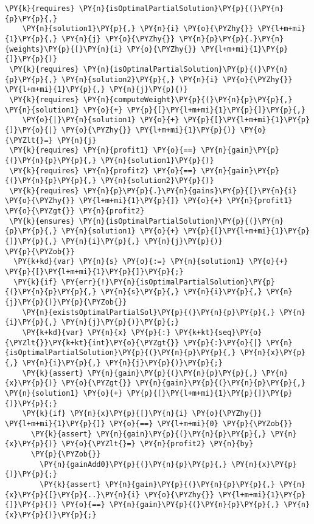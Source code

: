 \begin{sloppypar}
\begin{enumerate}
\begin{Verbatim}[commandchars=\\\{\}]
 \PY{k}{requires} \PY{n}{isOptimalPartialSolution}\PY{p}{(}\PY{n}{p}\PY{p}{,} 
    \PY{n}{solution1}\PY{p}{,} \PY{n}{i} \PY{o}{\PYZhy{}} \PY{l+m+mi}{1}\PY{p}{,} \PY{n}{j} \PY{o}{\PYZhy{}} \PY{n}{p}\PY{p}{.}\PY{n}{weights}\PY{p}{[}\PY{n}{i} \PY{o}{\PYZhy{}} \PY{l+m+mi}{1}\PY{p}{]}\PY{p}{)}
 \PY{k}{requires} \PY{n}{isOptimalPartialSolution}\PY{p}{(}\PY{n}{p}\PY{p}{,} \PY{n}{solution2}\PY{p}{,} \PY{n}{i} \PY{o}{\PYZhy{}} \PY{l+m+mi}{1}\PY{p}{,} \PY{n}{j}\PY{p}{)}
 \PY{k}{requires} \PY{n}{computeWeight}\PY{p}{(}\PY{n}{p}\PY{p}{,} \PY{n}{solution1} \PY{o}{+} \PY{p}{[}\PY{l+m+mi}{1}\PY{p}{]}\PY{p}{,} 
    \PY{o}{|}\PY{n}{solution1} \PY{o}{+} \PY{p}{[}\PY{l+m+mi}{1}\PY{p}{]}\PY{o}{|} \PY{o}{\PYZhy{}} \PY{l+m+mi}{1}\PY{p}{)} \PY{o}{\PYZlt{}=} \PY{n}{j}
 \PY{k}{requires} \PY{n}{profit1} \PY{o}{==} \PY{n}{gain}\PY{p}{(}\PY{n}{p}\PY{p}{,} \PY{n}{solution1}\PY{p}{)}
 \PY{k}{requires} \PY{n}{profit2} \PY{o}{==} \PY{n}{gain}\PY{p}{(}\PY{n}{p}\PY{p}{,} \PY{n}{solution2}\PY{p}{)}
 \PY{k}{requires} \PY{n}{p}\PY{p}{.}\PY{n}{gains}\PY{p}{[}\PY{n}{i} \PY{o}{\PYZhy{}} \PY{l+m+mi}{1}\PY{p}{]} \PY{o}{+} \PY{n}{profit1} \PY{o}{\PYZgt{}} \PY{n}{profit2}
 \PY{k}{ensures} \PY{n}{isOptimalPartialSolution}\PY{p}{(}\PY{n}{p}\PY{p}{,} \PY{n}{solution1} \PY{o}{+} \PY{p}{[}\PY{l+m+mi}{1}\PY{p}{]}\PY{p}{,} \PY{n}{i}\PY{p}{,} \PY{n}{j}\PY{p}{)}
\PY{p}{\PYZob{}}
  \PY{k+kd}{var} \PY{n}{s} \PY{o}{:=} \PY{n}{solution1} \PY{o}{+} \PY{p}{[}\PY{l+m+mi}{1}\PY{p}{]}\PY{p}{;}
  \PY{k}{if} \PY{err}{!}\PY{n}{isOptimalPartialSolution}\PY{p}{(}\PY{n}{p}\PY{p}{,} \PY{n}{s}\PY{p}{,} \PY{n}{i}\PY{p}{,} \PY{n}{j}\PY{p}{)}\PY{p}{\PYZob{}}
    \PY{n}{existsOptimalPartialSol}\PY{p}{(}\PY{n}{p}\PY{p}{,} \PY{n}{i}\PY{p}{,} \PY{n}{j}\PY{p}{)}\PY{p}{;}
    \PY{k+kd}{var} \PY{n}{x} \PY{p}{:} \PY{k+kt}{seq}\PY{o}{\PYZlt{}}\PY{k+kt}{int}\PY{o}{\PYZgt{}} \PY{p}{:}\PY{o}{|} \PY{n}{isOptimalPartialSolution}\PY{p}{(}\PY{n}{p}\PY{p}{,} \PY{n}{x}\PY{p}{,} \PY{n}{i}\PY{p}{,} \PY{n}{j}\PY{p}{)}\PY{p}{;}
    \PY{k}{assert} \PY{n}{gain}\PY{p}{(}\PY{n}{p}\PY{p}{,} \PY{n}{x}\PY{p}{)} \PY{o}{\PYZgt{}} \PY{n}{gain}\PY{p}{(}\PY{n}{p}\PY{p}{,} \PY{n}{solution1} \PY{o}{+} \PY{p}{[}\PY{l+m+mi}{1}\PY{p}{]}\PY{p}{)}\PY{p}{;}
    \PY{k}{if} \PY{n}{x}\PY{p}{[}\PY{n}{i} \PY{o}{\PYZhy{}} \PY{l+m+mi}{1}\PY{p}{]} \PY{o}{==} \PY{l+m+mi}{0} \PY{p}{\PYZob{}}
      \PY{k}{assert} \PY{n}{gain}\PY{p}{(}\PY{n}{p}\PY{p}{,} \PY{n}{x}\PY{p}{)} \PY{o}{\PYZlt{}=} \PY{n}{profit2} \PY{n}{by} 
      \PY{p}{\PYZob{}}
        \PY{n}{gainAdd0}\PY{p}{(}\PY{n}{p}\PY{p}{,} \PY{n}{x}\PY{p}{)}\PY{p}{;}
        \PY{k}{assert} \PY{n}{gain}\PY{p}{(}\PY{n}{p}\PY{p}{,} \PY{n}{x}\PY{p}{[}\PY{p}{..}\PY{n}{i} \PY{o}{\PYZhy{}} \PY{l+m+mi}{1}\PY{p}{]}\PY{p}{)} \PY{o}{==} \PY{n}{gain}\PY{p}{(}\PY{n}{p}\PY{p}{,} \PY{n}{x}\PY{p}{)}\PY{p}{;}

\end{Verbatim}
\end{enumerate}
\end{sloppypar}
